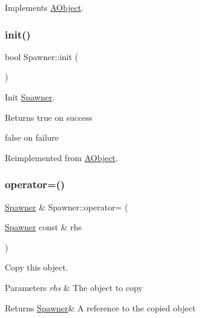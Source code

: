 Implements \hyperlink{class_a_object_a5e454e13e04ee937c20a465244cf748a}{A\+Object}.

\mbox{\label{class_spawner_a274d6abcfeb55784de07f3c36ae923ce}} 
\subsubsection{\texorpdfstring{init()}{init()}}
{\footnotesize\ttfamily bool Spawner\+::init (\begin{DoxyParamCaption}{ }\end{DoxyParamCaption})\hspace{0.3cm}{\ttfamily [virtual]}}



Init \hyperlink{class_spawner}{Spawner}. 

\begin{DoxyReturn}{Returns}
true on success 

false on failure 
\end{DoxyReturn}


Reimplemented from \hyperlink{class_a_object_afa83ef1c900a47453524219788327b86}{A\+Object}.

\mbox{\label{class_spawner_aa0930e4611747bff692f0feb2bf06a01}} 
\subsubsection{\texorpdfstring{operator=()}{operator=()}}
{\footnotesize\ttfamily \hyperlink{class_spawner}{Spawner} \& Spawner\+::operator= (\begin{DoxyParamCaption}\item[{\hyperlink{class_spawner}{Spawner} const \&}]{rhs }\end{DoxyParamCaption})}



Copy this object. 


\begin{DoxyParams}{Parameters}
{\em rhs} & The object to copy \\
\hline
\end{DoxyParams}
\begin{DoxyReturn}{Returns}
\hyperlink{class_spawner}{Spawner}\& A reference to the copied object 
\end{DoxyReturn}
\mbox{\label{class_spawner_ab8a55710ca6e122d975f697a9c7643bc}} 
